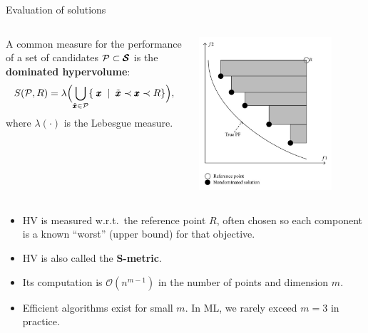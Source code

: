 \documentclass[11pt,compress,t,notes=noshow,xcolor=table]{beamer}
\begin{document}
\begin{vbframe}{Evaluation of solutions}

\begin{columns}
\begin{column}{0.5\textwidth}
A common measure for the performance of a set of candidates 
\(\mathcal{P}\subset\pmb{\mathcal{S}}\) is the \textbf{dominated hypervolume}:
\[
S(\mathcal{P},R) 
  = \lambda\Bigl(
      \bigcup_{\tilde{\pmb{x}}\in \mathcal{P}} 
         \{\;\pmb{x} \;\mid\; 
              \tilde{\pmb{x}}\prec \pmb{x} \prec R
         \}
    \Bigr),
\]
where \(\lambda(\cdot)\) is the Lebesgue measure.
\end{column}
\begin{column}{0.5\textwidth}
\begin{center}
\includegraphics[width=0.8\textwidth]{slides/11-multicrit/figure_man/dominated_hypervolume.png}
\end{center}
\end{column}
\end{columns}

\framebreak

\begin{itemize}
\item HV is measured w.r.t.\ the reference point \(R\), often chosen so each 
      component is a known “worst” (upper bound) for that objective.
\item HV is also called the \textbf{S-metric}.
\item Its computation is \(\mathcal{O}(n^{m-1})\) in the number of points 
      and dimension \(m\).
\item Efficient algorithms exist for small \(m\). 
      In ML, we rarely exceed \(m=3\) in practice.
\end{itemize}

\end{vbframe}

\endlecture
\end{document}
